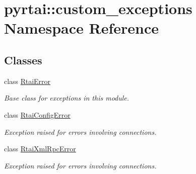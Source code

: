 \hypertarget{namespacepyrtai_1_1custom__exceptions}{
\section{pyrtai\-:\-:custom\-\_\-exceptions \-Namespace \-Reference}
\label{namespacepyrtai_1_1custom__exceptions}
}
\subsection*{\-Classes}
\begin{DoxyCompactItemize}
\item 
class \hyperlink{classpyrtai_1_1custom__exceptions_1_1_rtai_error}{\-Rtai\-Error}
\begin{DoxyCompactList}\small\item\em \-Base class for exceptions in this module. \end{DoxyCompactList}\item 
class \hyperlink{classpyrtai_1_1custom__exceptions_1_1_rtai_config_error}{\-Rtai\-Config\-Error}
\begin{DoxyCompactList}\small\item\em \-Exception raised for errors involving connections. \end{DoxyCompactList}\item 
class \hyperlink{classpyrtai_1_1custom__exceptions_1_1_rtai_xml_rpc_error}{\-Rtai\-Xml\-Rpc\-Error}
\begin{DoxyCompactList}\small\item\em \-Exception raised for errors involving connections. \end{DoxyCompactList}\end{DoxyCompactItemize}
